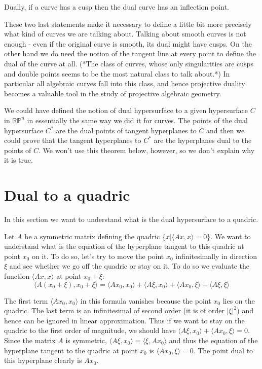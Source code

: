 Dually, if a curve has a cusp then the dual curve has an inflection point.

These two last statements make it necessary to define a little bit more precisely what kind of curves we are talking about. Talking about smooth curves is not enough - even if the original curve is smooth, its dual might have cusps. On the other hand we do need the notion of the tangent line at every point to define the dual of the curve at all. (*The class of curves, whose only singularities are cusps and double points seems to be the most natural class to talk about.*) In particular all algebraic curves fall into this class, and hence projective duality becomes a valuable tool in the study of projective algebraic geometry.

We could have defined the notion of dual hypersurface to a given hypersurface $C$ in $\mathbb{RP}^n$ in essentially the same way we did it for curves. The points of the dual hypersurface $C^*$ are the dual points of tangent hyperplanes to $C$ and then we could prove that the tangent hyperplanes to $C^*$ are the hyperplanes dual to the points of $C$. We won't use this theorem below, however, so we don't explain why it is true.

\section{Dual to a quadric}

In this section we want to understand what is the dual hypersurface to a quadric.

Let $A$ be a symmetric matrix defining the quadric $\{x|\langle Ax, x\rangle =0\}$. We want to understand what is the equation of the hyperplane tangent to this quadric at point $x_0$ on it. To do so, let's try to move the point $x_0$ infinitesimally in direction $\xi$ and see whether we go off the quadric or stay on it. To do so we evaluate the function $\langle Ax,x \rangle$ at point $x_0+\xi$: $$\langle A(x_0+\xi), x_0+\xi \rangle = \langle Ax_0,x_0 \rangle + \langle A\xi, x_0 \rangle + \langle A x_0, \xi \rangle + \langle A \xi, \xi \rangle$$

The first term $\langle Ax_0,x_0 \rangle$ in this formula vanishes because the point $x_0$ lies on the quadric. The last term is an infinitesimal of second order (it is of order $|\xi|^2$) and hence can be ignored in linear approximation. Thus if we want to stay on the quadric to the first order of magnitude, we should have $ \langle A\xi, x_0 \rangle + \langle A x_0, \xi \rangle =0$. Since the matrix $A$ is symmetric, $\langle A\xi,x_0 \rangle = \langle \xi, Ax_0 \rangle$ and thus the equation of the hyperplane tangent to the quadric at point $x_0$ is $\langle Ax_0,\xi \rangle=0$. The point dual to this hyperplane clearly is $Ax_0$.

